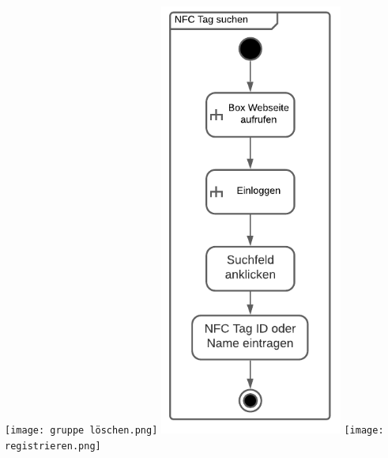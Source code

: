 \documentclass[10pt, a4paper]{article}
\begin{document}
  \newpage
  \texttt{[image: gruppe löschen.png]}
  \newpage
  \includegraphics[width=0.45\textwidth]{nfc tag suchen.png}
  \texttt{[image: registrieren.png]}
  \newpage
\end{document}
